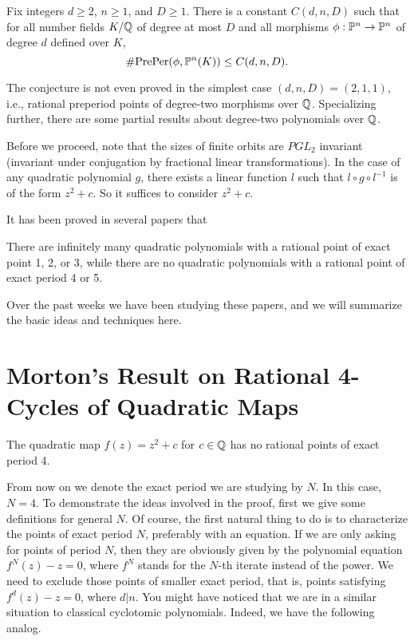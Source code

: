\begin{conjecture}
  Fix integers $d \ge 2$, $n \ge 1$, and $D \ge 1$. There is a
  constant $C(d, n, D)$ such that for all number fields $K/\Q$ of
  degree at most $D$ and all morphisms $\phi: \P^n \to \P^n$ of degree
  $d$ defined over $K$,
  \[
  \#\preper(\phi, \P^n(K)) \le C(d, n, D).
  \]
\end{conjecture}

\begin{remark}
  The conjecture is not even proved in the simplest case $(d, n, D) =
  (2, 1, 1)$, i.e., rational preperiod points of degree-two morphisms
  over $\Q$. Specializing further, there are some partial results
  about degree-two polynomials over $\Q$.

  Before we proceed, note that the sizes of finite orbits are $PGL_2$
  invariant (invariant under conjugation by fractional linear
  transformations). In the case of any quadratic polynomial $g$, there
  exists a linear function $l$ such that $l \circ g \circ l^{-1}$ is
  of the form $z^2 + c$. So it suffices to consider $z^2 + c$.

  It has been proved in several papers that
\end{remark}

\begin{theorem}
  There are infinitely many quadratic polynomials with a rational
  point of exact point 1, 2, or 3, while there are no quadratic
  polynomials with a rational point of exact period 4 or 5.
\end{theorem}

Over the past weeks we have been studying these papers, and we will
summarize the basic ideas and techniques here.



\section{Morton's Result on Rational 4-Cycles of Quadratic Maps}

\begin{theorem} [Morton, 1998]
  The quadratic map $f(z) = z^2 + c$ for $c \in \Q$ has no rational
  points of exact period 4.
\end{theorem}

From now on we denote the exact period we are studying by $N$. In this
case, $N = 4$. To demonstrate the ideas involved in the proof, first
we give some definitions for general $N$. Of course, the first natural
thing to do is to characterize the points of exact period $N$,
preferably with an equation. If we are only asking for points of
period $N$, then they are obviously given by the polynomial equation
$f^N(z) - z = 0$, where $f^N$ stands for the $N$-th iterate instead of
the power. We need to exclude those points of smaller exact period,
that is, points satisfying $f^d(z) - z = 0$, where $d | n$. You might
have noticed that we are in a similar situation to classical
cyclotomic polynomials. Indeed, we have the following analog.

